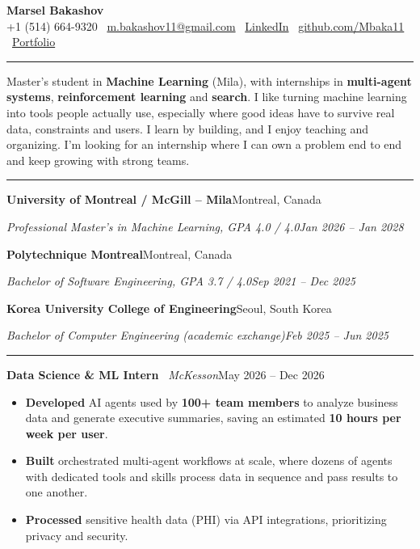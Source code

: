 \documentclass[a4paper,10pt]{article}
\newcommand{\sep}{\textbar\ }
\newcommand{\cvsection}[1]{\vspace{0.55em}\noindent{\textbf{\MakeUppercase{#1}}}\par\vspace{-0.4em}\noindent\rule{\linewidth}{0.4pt}\par\vspace{0.25em}}
\newcommand{\cvrow}[2]{\noindent #1\hfill #2\par}
\newenvironment{cvlist}{\begin{itemize}[leftmargin=1.1em,itemsep=0pt,topsep=1pt,parsep=0pt,partopsep=0pt,label=\textbullet]}{\end{itemize}\vspace{0.3em}}
\begin{document}
\fontsize{10}{12}\selectfont

\begin{center}
  {\fontsize{22}{24}\selectfont\textbf{Marsel Bakashov}}\\[0.3em]
  +1 (514) 664-9320 \sep \href{mailto:m.bakashov11@gmail.com}{m.bakashov11@gmail.com} \sep \href{https://www.linkedin.com/in/marsel-bakashov-813643213/}{LinkedIn} \sep \href{https://github.com/Mbaka11}{github.com/Mbaka11} \sep \href{https://marselbak.netlify.app/}{Portfolio}
\end{center}
\vspace{-0.6em}

\cvsection{Summary}
Master's student in \textbf{Machine Learning} (Mila), with internships in \textbf{multi-agent systems}, \textbf{reinforcement learning} and \textbf{search}. I like turning machine learning into tools people actually use, especially where good ideas have to survive real data, constraints and users. I learn by building, and I enjoy teaching and organizing. I'm looking for an internship where I can own a problem end to end and keep growing with strong teams.

\cvsection{Education}
\cvrow{\textbf{University of Montreal / McGill -- Mila}}{Montreal, Canada}
\cvrow{\textit{Professional Master's in Machine Learning, GPA 4.0 / 4.0}}{\textit{Jan 2026 -- Jan 2028}}
\vspace{0.2em}
\cvrow{\textbf{Polytechnique Montreal}}{Montreal, Canada}
\cvrow{\textit{Bachelor of Software Engineering, GPA 3.7 / 4.0}}{\textit{Sep 2021 -- Dec 2025}}
\vspace{0.2em}
\cvrow{\textbf{Korea University College of Engineering}}{Seoul, South Korea}
\cvrow{\textit{Bachelor of Computer Engineering (academic exchange)}}{\textit{Feb 2025 -- Jun 2025}}

\cvsection{Experience}
\cvrow{\textbf{Data Science \& ML Intern} \sep \textit{McKesson}}{May 2026 -- Dec 2026}
\begin{cvlist}
  \item \textbf{Developed} AI agents used by \textbf{100+ team members} to analyze business data and generate executive summaries, saving an estimated \textbf{10 hours per week per user}.
  \item \textbf{Built} orchestrated multi-agent workflows at scale, where dozens of agents with dedicated tools and skills process data in sequence and pass results to one another.
  \item \textbf{Processed} sensitive health data (PHI) via API integrations, prioritizing privacy and security.
\end{cvlist}
\end{document}
